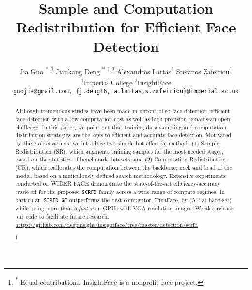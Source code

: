 \documentclass[10pt,twocolumn,letterpaper]{article}
\newcommand{\dsname}[1]{\texttt{\small #1}\xspace}
\newcommand{\scrfd}{\dsname{SCRFD}}
\newcommand{\scrfdf}[1]{\dsname{SCRFD-\text{#1}GF}}
\newcommand*{\affaddr}[1]{#1}
\newcommand*{\affmark}[1][*]{\textsuperscript{#1}}
\renewcommand\thefootnote{}
\begin{document}
\title{Sample and Computation Redistribution for Efficient Face Detection}

\author{
Jia Guo \textsuperscript{*} \affmark[2] \qquad 
Jiankang Deng \textsuperscript{*} \affmark[1,2] \qquad
Alexandros Lattas\affmark[1] \qquad Stefanos Zafeiriou\affmark[1]\\
\affaddr{\affmark[1]Imperial College} \qquad
\affaddr{\affmark[2]InsightFace} \qquad \\
{\tt\small guojia@gmail.com, \{j.deng16, a.lattas,s.zafeiriou\}@imperial.ac.uk}
}

\maketitle
\ificcvfinal\thispagestyle{empty}\fi

\begin{abstract}
Although tremendous strides have been made in uncontrolled face detection, efficient face detection with a low computation cost as well as high precision remains an open challenge. In this paper, we point out that training data sampling and computation distribution strategies are the keys to efficient and accurate face detection. Motivated by these observations, we introduce two simple but effective methods (1) Sample Redistribution (SR), which augments training samples for the most needed stages, based on the statistics of benchmark datasets; and (2) Computation Redistribution (CR), which reallocates the computation between the backbone, neck and head of the model, based on a meticulously defined search methodology. Extensive experiments conducted on WIDER FACE demonstrate the state-of-the-art efficiency-accuracy trade-off for the proposed \scrfd family across a wide range of compute regimes. In particular, \scrfdf{34} outperforms the best competitor, TinaFace, by  (AP at hard set) while being more than \emph{3 faster} on GPUs with VGA-resolution images. We also release our code to facilitate future research. \url{https://github.com/deepinsight/insightface/tree/master/detection/scrfd}

\footnote{\textsuperscript{*} Equal contributions. 
InsightFace is a nonprofit face project.} 
\setcounter{footnote}{0}
\renewcommand\thefootnote{\arabic{footnote}}
\end{abstract}
\end{document}
